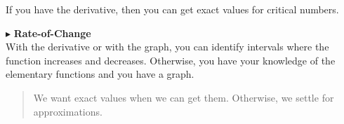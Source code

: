 \documentclass{ximera}
\begin{document}
If you have the derivative, then you can get exact values for critical numbers.



$\blacktriangleright$ \textbf{\textcolor{red!10!blue!90!}{Rate-of-Change}} \\
With the derivative or with the graph, you can identify intervals where the function increases and decreases. Otherwise, you have your knowledge of the elementary functions and you have a graph.


\begin{quote}
We want exact values when we can get them.  Otherwise, we settle for approximations. \\
\end{quote}
\end{document}

